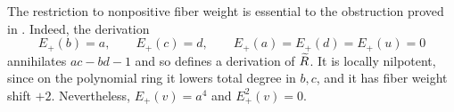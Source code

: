 \begin{remark}\label{red:sign-essential}
The restriction to nonpositive fiber weight is essential to the
obstruction proved in .  Indeed, the derivation
\[
  E_+(b)=a,\qquad E_+(c)=d,\qquad
  E_+(a)=E_+(d)=E_+(u)=0
\]
annihilates $ac-bd-1$ and so defines a derivation of $\widetilde R$.
It is locally nilpotent, since on the polynomial ring it lowers total
degree in $b,c$, and it has fiber weight shift $+2$.  Nevertheless,
$E_+(v)=a^4$ and $E_+^2(v)=0$.
\end{remark}
